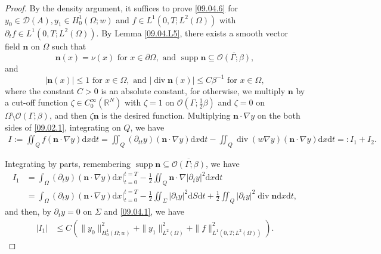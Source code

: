 \documentclass[preprint,12pt]{elsarticle}
\theoremstyle{definition}   %
\numberwithin{equation}{section}
\def\pt{\partial}
\def\bs{\boldsymbol}
\def\s{\subseteq}
\def\ol{\overline}
\def\pt{\partial}
\def\Om{\Omega}
\def\be{\beta}
\def\Ga{\Gamma}
\def\iy{\infty}
\def\f{\frac}
\def\se{\setminus}
\def\df{\mathrm d}
\def\mcO{\mathcal{O}}
\def\mcD{\mathcal{D}}
\DeclareMathOperator{\Div}{div}
\DeclareMathOperator{\supp}{{supp}}
\newcommand{\R}{\mathbb R}
\begin{document}
\begin{proof}
	By the density argument, it suffices to prove \eqref{09.04.6} for $y_0\in \mcD(A), y_1\in H_0^1(\Om;w)$ and $f\in L^1(0,T;L^2(\Om))$ with $\pt_t f\in L^1(0,T; L^2(\Om))$. By Lemma \ref{09.04.L5}, there exists a smooth vector field $\bs{n}$ on $\Om$ such that 
	\begin{equation*}
		\bs{n}(x)=\nu(x) \mbox{ for } x\in\pt\Om,  \mbox{ and } \supp \bs{n}\s \ol{\mcO({\Ga;\be})},
	\end{equation*}
	and 
	\begin{equation*}
		|\bs{n}(x)|\leq 1 \mbox{ for } x\in \Om,\mbox{ and } |\Div \bs{n}(x)|\leq C\be^{-1} \mbox{ for } x\in \Om, 
	\end{equation*}
	where the constant $C>0$ is an absolute constant, for otherwise, we multiply $\bs{n}$ by a cut-off function $\zeta\in C_0^\iy(\R^N)$ with $\zeta=1$ on $\mcO(\Ga;\f{1}{2}\be)$ and $\zeta=0$ on $\Om\se \mcO(\Ga;\be)$, and then $\zeta\bs{n}$ is the desired function. 
	Multiplying $\bs{n}\cdot \nabla y$ on the both sides of \eqref{09.02.1}, integrating on $Q$, we have 
	\begin{equation*}
		\begin{split}
			I:=\iint_Q f(\bs{n}\cdot\nabla y)\df x\df t=\iint_Q (\pt_{tt}y)(\bs{n}\cdot \nabla y)\df x\df t-\iint_Q \Div(w\nabla y) (\bs{n}\cdot \nabla y)\df x\df t=:I_1+I_2. 
		\end{split}
	\end{equation*}
	
	Integrating by parts, remembering $\supp \bs{n}\s \ol{\mcO(\Ga;\be)}$, we have
	\begin{equation*}
		\begin{split}
			I_1
			&=\int_\Om (\pt_ty)(\bs n\cdot \nabla y)\df x\bigg|_{t=0}^{t=T}-\f{1}{2}\iint_Q \bs{n}\cdot \nabla |\pt_ty|^2\df x\df t\\
			&=\int_\Om (\pt_ty)(\bs n\cdot \nabla y)\df x\bigg|_{t=0}^{t=T}-\f{1}{2}\iint_\Sigma |\pt_ty|^2\df S\df t+\f{1}{2}\iint_Q |\pt_ty|^2\Div\bs{n}\df x\df t, 
		\end{split}
	\end{equation*}
	and then, by $\pt_ty=0$ on $\Sigma$ and \eqref{09.04.1}, we have 
	\begin{equation}\label{09.05.1}
		\begin{split}
			|I_1|
			&\leq C\left(\|y_0\|_{H_0^1(\Om;w)}^2+\|y_1\|_{L^2(\Om)}^2+\|f\|_{L^1(0,T; L^2(\Om))}^2\right). 
		\end{split}
	\end{equation}
	

\end{proof}
\end{document}

